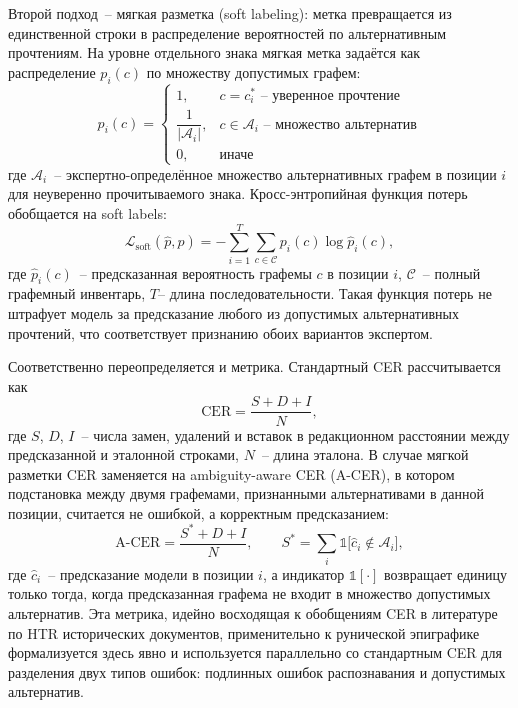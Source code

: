 \documentclass[a4paper,12pt]{extarticle}
\begin{document}
Второй подход~-- мягкая разметка (soft labeling): метка превращается из единственной строки в распределение вероятностей по альтернативным прочтениям. На уровне отдельного знака мягкая метка задаётся как распределение $p_i(c)$ по множеству допустимых графем:
\begin{equation}
p_i(c) = \begin{cases}
1, & c = c^*_i \text{~-- уверенное прочтение} \\
\dfrac{1}{|\mathcal{A}_i|}, & c \in \mathcal{A}_i \text{~-- множество альтернатив} \\
0, & \text{иначе}
\end{cases}
\label{eq:softlabel}
\end{equation}
где $\mathcal{A}_i$~-- экспертно-определённое множество альтернативных графем в позиции $i$ для неуверенно прочитываемого знака. Кросс-энтропийная функция потерь обобщается на soft labels:
\begin{equation}
\mathcal{L}_{\text{soft}}(\hat{p}, p) = -\sum_{i=1}^{T} \sum_{c \in \mathcal{C}} p_i(c) \log \hat{p}_i(c),
\label{eq:softloss}
\end{equation}
где $\hat{p}_i(c)$~-- предсказанная вероятность графемы $c$ в позиции $i$, $\mathcal{C}$~-- полный графемный инвентарь, $T$-- длина последовательности. Такая функция потерь не штрафует модель за предсказание любого из допустимых альтернативных прочтений, что соответствует признанию обоих вариантов экспертом.

Соответственно переопределяется и метрика. Стандартный CER рассчитывается как
\begin{equation}
\text{CER} = \frac{S + D + I}{N},
\label{eq:cer}
\end{equation}
где $S$, $D$, $I$~-- числа замен, удалений и вставок в редакционном расстоянии между предсказанной и эталонной строками, $N$~-- длина эталона. В случае мягкой разметки CER заменяется на ambiguity-aware CER (A-CER), в котором подстановка между двумя графемами, признанными альтернативами в данной позиции, считается не ошибкой, а корректным предсказанием:
\begin{equation}
\text{A-CER} = \frac{S^* + D + I}{N}, \qquad S^* = \sum_{i} \mathbb{1}\bigl[\hat{c}_i \notin \mathcal{A}_i\bigr],
\label{eq:acer}
\end{equation}
где $\hat{c}_i$~-- предсказание модели в позиции $i$, а индикатор $\mathbb{1}[\cdot]$ возвращает единицу только тогда, когда предсказанная графема не входит в множество допустимых альтернатив. Эта метрика, идейно восходящая к обобщениям CER в литературе по HTR исторических документов, применительно к рунической эпиграфике формализуется здесь явно и используется параллельно со стандартным CER для разделения двух типов ошибок: подлинных ошибок распознавания и допустимых альтернатив.
\end{document}
